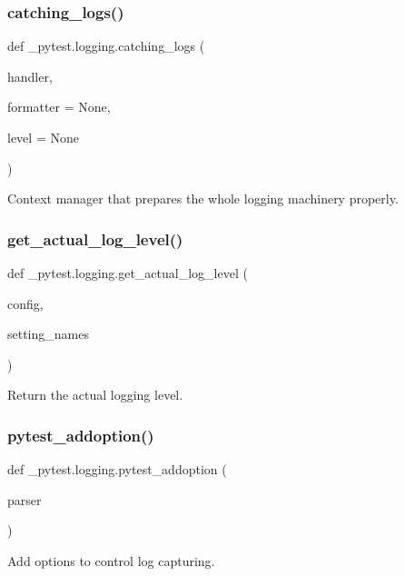 \subsubsection{\texorpdfstring{catching\+\_\+logs()}{catching\_logs()}}
{\footnotesize\ttfamily def \+\_\+pytest.\+logging.\+catching\+\_\+logs (\begin{DoxyParamCaption}\item[{}]{handler,  }\item[{}]{formatter = {\ttfamily None},  }\item[{}]{level = {\ttfamily None} }\end{DoxyParamCaption})}

\begin{DoxyVerb}Context manager that prepares the whole logging machinery properly.\end{DoxyVerb}
 \mbox{\label{namespace__pytest_1_1logging_a62922e3596d372c67b2278069d76b38c}} 
\subsubsection{\texorpdfstring{get\+\_\+actual\+\_\+log\+\_\+level()}{get\_actual\_log\_level()}}
{\footnotesize\ttfamily def \+\_\+pytest.\+logging.\+get\+\_\+actual\+\_\+log\+\_\+level (\begin{DoxyParamCaption}\item[{}]{config,  }\item[{}]{setting\+\_\+names }\end{DoxyParamCaption})}

\begin{DoxyVerb}Return the actual logging level.\end{DoxyVerb}
 \mbox{\label{namespace__pytest_1_1logging_a7d11ed285b6542e63c42b1f27b49cefa}} 
\subsubsection{\texorpdfstring{pytest\+\_\+addoption()}{pytest\_addoption()}}
{\footnotesize\ttfamily def \+\_\+pytest.\+logging.\+pytest\+\_\+addoption (\begin{DoxyParamCaption}\item[{}]{parser }\end{DoxyParamCaption})}

\begin{DoxyVerb}Add options to control log capturing.\end{DoxyVerb}
 